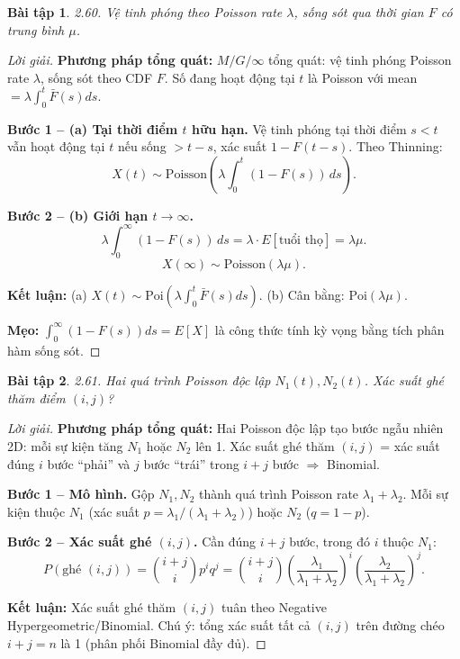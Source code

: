 \documentclass[8pt,a4paper]{article}
\newtheorem{exercise}{Bài tập}
\newenvironment{solution}{\begin{proof}[Lời giải]}{\end{proof}}
\begin{document}
\begin{exercise}
2.60. Vệ tinh phóng theo Poisson rate $\lambda$, sống sót qua thời gian $F$ có trung bình $\mu$.
\end{exercise}
\begin{solution}
\textbf{Phương pháp tổng quát:} $M/G/\infty$ tổng quát: vệ tinh phóng Poisson rate $\lambda$, sống sót theo CDF $F$. Số đang hoạt động tại $t$ là Poisson với mean $= \lambda \int_0^t \bar{F}(s) ds$.

\textbf{Bước 1 -- (a) Tại thời điểm $t$ hữu hạn.} Vệ tinh phóng tại thời điểm $s < t$ vẫn hoạt động tại $t$ nếu sống $> t-s$, xác suất $1-F(t-s)$. Theo Thinning:
\[
  X(t) \sim \text{Poisson}\left(\lambda \int_0^t (1-F(s)) \, ds\right).
\]

\textbf{Bước 2 -- (b) Giới hạn $t \to \infty$.}
\[
  \lambda \int_0^\infty (1-F(s)) \, ds = \lambda \cdot E[\text{tuổi thọ}] = \lambda\mu.
\]
\[
  \boxed{X(\infty) \sim \text{Poisson}(\lambda\mu)}.
\]

\textbf{Kết luận:} (a) $X(t) \sim \text{Poi}\left(\lambda\int_0^t \bar{F}(s)ds\right)$. (b) Cân bằng: $\text{Poi}(\lambda\mu)$.

\textbf{Mẹo:} $\int_0^\infty (1-F(s))ds = E[X]$ là công thức tính kỳ vọng bằng tích phân hàm sống sót.
\end{solution}

\begin{exercise}
2.61. Hai quá trình Poisson độc lập $N_1(t), N_2(t)$. Xác suất ghé thăm điểm $(i, j)$?
\end{exercise}
\begin{solution}
\textbf{Phương pháp tổng quát:} Hai Poisson độc lập tạo bước ngẫu nhiên 2D: mỗi sự kiện tăng $N_1$ hoặc $N_2$ lên 1. Xác suất ghé thăm $(i,j)$ = xác suất đúng $i$ bước ``phải'' và $j$ bước ``trái'' trong $i+j$ bước $\Rightarrow$ Binomial.

\textbf{Bước 1 -- Mô hình.} Gộp $N_1, N_2$ thành quá trình Poisson rate $\lambda_1+\lambda_2$. Mỗi sự kiện thuộc $N_1$ (xác suất $p = \lambda_1/(\lambda_1+\lambda_2)$) hoặc $N_2$ ($q = 1-p$).

\textbf{Bước 2 -- Xác suất ghé $(i,j)$.} Cần đúng $i+j$ bước, trong đó $i$ thuộc $N_1$:
\[
  \boxed{P(\text{ghé } (i,j)) = \binom{i+j}{i} p^i q^j = \binom{i+j}{i}\left(\frac{\lambda_1}{\lambda_1+\lambda_2}\right)^i \left(\frac{\lambda_2}{\lambda_1+\lambda_2}\right)^j}.
\]

\textbf{Kết luận:} Xác suất ghé thăm $(i,j)$ tuân theo Negative Hypergeometric/Binomial. Chú ý: tổng xác suất tất cả $(i,j)$ trên đường chéo $i+j = n$ là 1 (phân phối Binomial đầy đủ).
\end{solution}
\end{document}
